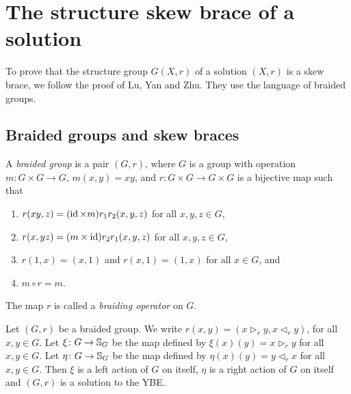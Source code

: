 \chapter{The structure skew brace of a solution}
\label{structure_brace}


To prove that the structure group $G(X,r)$ of a solution $(X,r)$ is a skew brace, we follow the 
proof of Lu, Yan and Zhu. They use the language of braided groups.

\section{Braided groups and skew braces}

\begin{definition}\label{braidedgroup}
A \emph{braided group} is a pair $(G,r)$, where 
$G$ is a group with operation $m\colon G\times G\to G$, $m(x,y)=xy$, and 
$r\colon G\times G\to G\times G$ is a bijective map such that
\begin{enumerate}
\item $r(xy,z)=(\operatorname{id}\times m)r_1r_2(x,y,z)$ for all $x,y,z\in G$,
\item $r(x,yz)=(m\times\operatorname{id})r_2r_1(x,y,z)$ for all $x,y,z\in G$,
\item $r(1,x)=(x,1)$ and $r(x,1)=(1,x)$ for all $x\in G$, and 
\item $m\circ r=m$.
\end{enumerate}
The map $r$ is called a \emph{braiding operator} on $G$. 
\end{definition}

\begin{lemma}
\label{lem:braidedsolYBE}
Let $(G,r)$ be a braided group. We write $r(x,y)=(x\rhd_r y,x\lhd_r y)$, for all $x,y\in G$. Let $\xi\colon G\rightarrow \mathbb{S}_G$ be the map defined by $\xi(x)(y)=x\rhd_r y$ for all $x,y\in G$. Let $\eta\colon G\rightarrow \mathbb{S}_G$ be the map defined by $\eta(x)(y)=y\lhd_r x$ for all $x,y\in G$. Then $\xi$ is a left action of $G$ on itself, $\eta$ is a right action of $G$ on itself and $(G,r)$ is a solution to the YBE. 
\end{lemma}

